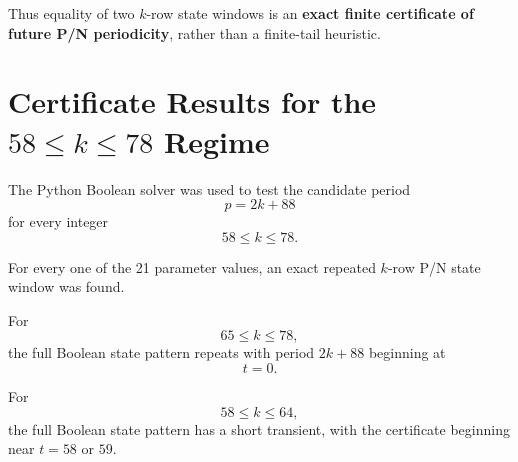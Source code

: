 \documentclass[11pt]{article}
\begin{document}
Thus equality of two $k$-row state windows is an \textbf{exact finite certificate of future P/N periodicity}, rather than a finite-tail heuristic.

\section{Certificate Results for the $58\le k\le78$ Regime}

The Python Boolean solver was used to test the candidate period
\begin{equation}
    p=2k+88
\end{equation}
for every integer
\begin{equation}
    58\le k\le78.
\end{equation}

For every one of the 21 parameter values, an exact repeated $k$-row P/N state window was found.

For
\begin{equation}
    65\le k\le78,
\end{equation}
the full Boolean state pattern repeats with period $2k+88$ beginning at
\begin{equation}
    t=0.
\end{equation}

For
\begin{equation}
    58\le k\le64,
\end{equation}
the full Boolean state pattern has a short transient, with the certificate beginning near $t=58$ or $59$.
\end{document}
